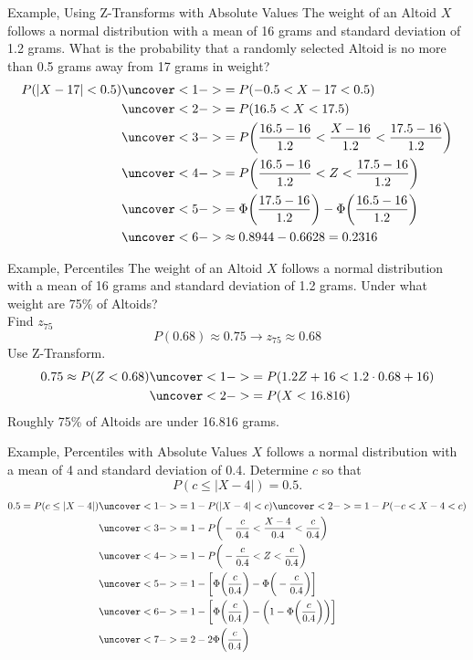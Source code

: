 \documentclass[handout]{beamer}
\newcommand{\nl}[1]{\vspace{#1 em}}
\begin{document}
\begin{frame}{Example, Using Z-Transforms with Absolute Values}
    The weight of an Altoid $X$ follows a normal distribution with a mean of 16 grams and standard deviation of 1.2 grams. What is the probability that a randomly selected Altoid is no more than 0.5 grams away from 17 grams in weight?
    \\ \nl{0.5}
    \begin{align*}
        P(|X-17|<0.5) & \uncover<1->{= P(-0.5<X-17<0.5)}\\
        & \uncover<2->{ = P(16.5<X<17.5)} \\
        & \uncover<3->{ = P\bigg(\frac{16.5-16}{1.2}<\frac{X-16}{1.2}<\frac{17.5-16}{1.2}\bigg)} \\
        & \uncover<4->{ = P\bigg(\frac{16.5-16}{1.2}<Z<\frac{17.5-16}{1.2}\bigg)} \\
        & \uncover<5->{ = \Phi \bigg(\frac{17.5-16}{1.2}\bigg) - \Phi\bigg(\frac{16.5-16}{1.2}\bigg)} \\
        & \uncover<6->{\approx 0.8944 - 0.6628 = 0.2316 } \\
    \end{align*}
\end{frame}
\begin{frame}{Example, Percentiles}
    The weight of an Altoid $X$ follows a normal distribution with a mean of 16 grams and standard deviation of 1.2 grams. Under what weight are 75\% of Altoids?
    \\ \nl{0.5}
    \pause Find $z_{75}$
    \pause $$ P(0.68) \approx 0.75 \to z_{75} \approx 0.68 $$
    \pause Use Z-Transform.
    \begin{align*}
        0.75 \approx P(Z<0.68) & \uncover<1->{= P(1.2Z+16<1.2\cdot 0.68 +16)}\\
        & \uncover<2->{ = P(X<16.816)} \\
    \end{align*}
    \pause Roughly 75\% of Altoids are under 16.816 grams.
\end{frame}
\begin{frame}{Example, Percentiles with Absolute Values}
    $X$ follows a normal distribution with a mean of 4 and standard deviation of 0.4. Determine $c$ so that 
    $$P(c \leq |X-4|)=0.5.$$
    \begin{align*}
        0.5 = P(c \leq |X-4|) & \uncover<1->{= 1 - P(|X-4|<c)}  \uncover<2->{ = 1 -P(-c < X-4 < c)} \\
        & \uncover<3->{ = 1 -P\bigg(-\frac{c}{0.4} < \frac{X-4}{0.4} < \frac{c}{0.4}\bigg)} \\
        & \uncover<4->{ = 1 -P\bigg(-\frac{c}{0.4} < Z < \frac{c}{0.4}\bigg)} \\
        & \uncover<5->{ = 1 -\bigg[\Phi\bigg(\frac{c}{0.4}\bigg) - \Phi\bigg(-\frac{c}{0.4}\bigg)\bigg]} \\
        & \uncover<6->{ = 1 -\bigg[\Phi\bigg(\frac{c}{0.4}\bigg) - \bigg(1 - \Phi\bigg(\frac{c}{0.4}\bigg)\bigg)\bigg]} \\
        & \uncover<7->{ = 2 - 2 \Phi\bigg( \frac{c}{0.4} \bigg)} \\
    \end{align*}
\end{frame}
\end{document}

